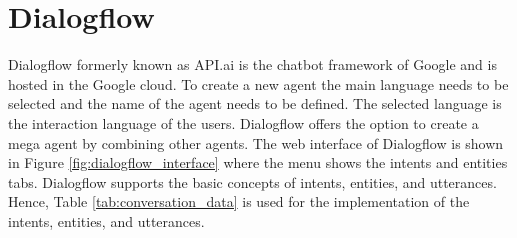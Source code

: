 \section{Dialogflow}
Dialogflow\cite{dialogflow} formerly known as API.ai is the chatbot framework of Google and 
is hosted in the Google cloud.
To create a new agent the main language needs to be selected and the name of the 
agent needs to be defined.
The selected language is the interaction language of the users.
Dialogflow offers the option to create a mega agent by combining other agents.
The web interface of Dialogflow is shown in Figure \ref{fig:dialogflow_interface} where 
the menu shows the intents and entities tabs.
Dialogflow supports the basic concepts of intents, entities, and utterances.
Hence, Table \ref{tab:conversation_data} is used for the implementation 
of the intents, entities, and utterances.
